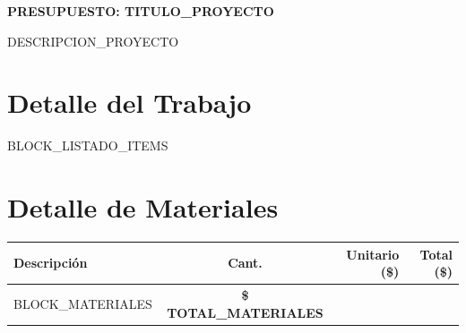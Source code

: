 \documentclass[10pt, letterpaper]{article}
\begin{document}
\renewcommand{\arraystretch}{1.1}


\begin{center}
    \Large\textbf{PRESUPUESTO: TITULO_PROYECTO}
\end{center}

\vspace{0.2cm}


\begin{center}
    DESCRIPCION_PROYECTO
\end{center}

\vspace{0.2cm}



\section*{Detalle del Trabajo}

\begin{itemize}
BLOCK_LISTADO_ITEMS
\end{itemize}

\vspace{0.4cm}



\section*{Detalle de Materiales}

\begin{tabularx}{\textwidth}{Xcrr}

\toprule

\textbf{Descripción}
&
\textbf{Cant.}
&
\textbf{Unitario (\$)}
&
\textbf{Total (\$)}
\\

\midrule

BLOCK_MATERIALES

\midrule

\multicolumn{3}{l}{
    \textbf{TOTAL PRESUPUESTADO MATERIALES}
}
&
\textbf{\$ TOTAL_MATERIALES}
\\

\bottomrule

\end{tabularx}
\end{document}
